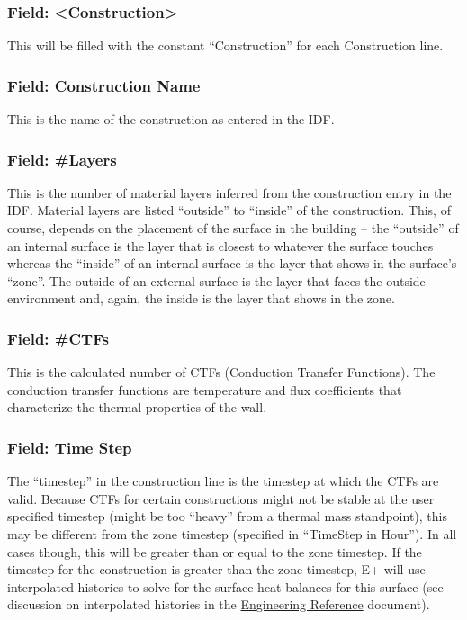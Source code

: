 \subsubsection{Field: \textless{}Construction\textgreater{}}\label{field-construction-1}

This will be filled with the constant ``Construction'' for each Construction line.

\subsubsection{Field: Construction Name}\label{field-construction-name}

This is the name of the construction as entered in the IDF.

\subsubsection{Field: \#Layers}\label{field-layers}

This is the number of material layers inferred from the construction entry in the IDF. Material layers are listed ``outside'' to ``inside'' of the construction. This, of course, depends on the placement of the surface in the building -- the ``outside'' of an internal surface is the layer that is closest to whatever the surface touches whereas the ``inside'' of an internal surface is the layer that shows in the surface's ``zone''. The outside of an external surface is the layer that faces the outside environment and, again, the inside is the layer that shows in the zone.

\subsubsection{Field: \#CTFs}\label{field-ctfs}

This is the calculated number of CTFs (Conduction Transfer Functions). The conduction transfer functions are temperature and flux coefficients that characterize the thermal properties of the wall.

\subsubsection{Field: Time Step}\label{field-time-step}

The ``timestep'' in the construction line is the timestep at which the CTFs are valid. Because CTFs for certain constructions might not be stable at the user specified timestep (might be too ``heavy'' from a thermal mass standpoint), this may be different from the zone timestep (specified in ``TimeStep in Hour''). In all cases though, this will be greater than or equal to the zone timestep. If the timestep for the construction is greater than the zone timestep, E+ will use interpolated histories to solve for the surface heat balances for this surface (see discussion on interpolated histories in the \href{file:///E:/Docs4PDFs/EngineeringDoc.pdf}{Engineering Reference} document).

